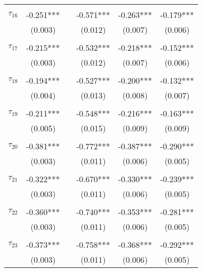 \begin{tabular}{@{\extracolsep{-5pt}}lccccc}
                &           &&           &           &           \\[-2.1ex]
$\tau_{16}$     & -0.251*** && -0.571*** & -0.263*** & -0.179*** \\
                &  (0.003)  &&  (0.012)  &  (0.007)  &  (0.006)  \\
                &           &&           &           &           \\[-2.1ex]
$\tau_{17}$     & -0.215*** && -0.532*** & -0.218*** & -0.152*** \\
                &  (0.003)  &&  (0.012)  &  (0.007)  &  (0.006)  \\
                &           &&           &           &           \\[-2.1ex]
$\tau_{18}$     & -0.194*** && -0.527*** & -0.200*** & -0.132*** \\
                &  (0.004)  &&  (0.013)  &  (0.008)  &  (0.007)  \\
                &           &&           &           &           \\[-2.1ex]
$\tau_{19}$     & -0.211*** && -0.548*** & -0.216*** & -0.163*** \\
                &  (0.005)  &&  (0.015)  &  (0.009)  &  (0.009)  \\
                &           &&           &           &           \\[-2.1ex]
$\tau_{20}$     & -0.381*** && -0.772*** & -0.387*** & -0.290*** \\
                &  (0.003)  &&  (0.011)  &  (0.006)  &  (0.005)  \\
                &           &&           &           &           \\[-2.1ex]
$\tau_{21}$     & -0.322*** && -0.670*** & -0.330*** & -0.239*** \\
                &  (0.003)  &&  (0.011)  &  (0.006)  &  (0.005)  \\
                &           &&           &           &           \\[-2.1ex]
$\tau_{22}$     & -0.360*** && -0.740*** & -0.353*** & -0.281*** \\
                &  (0.003)  &&  (0.011)  &  (0.006)  &  (0.005)  \\
                &           &&           &           &           \\[-2.1ex]
$\tau_{23}$     & -0.373*** && -0.758*** & -0.368*** & -0.292*** \\
                &  (0.003)  &&  (0.011)  &  (0.006)  &  (0.005)  \\

\end{tabular}
